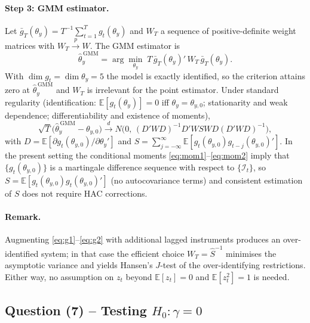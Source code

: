 \documentclass[12pt]{article}
\newcommand{\E}{\mathbb{E}}
\newcommand{\Info}{\mathcal{I}}
\begin{document}
\paragraph{Step 3: GMM estimator.} Let $\bar{g}_T(\theta_y)=T^{-1}\sum_{t=1}^{T}g_t(\theta_y)$ and $W_T$ a sequence of positive-definite weight matrices with $W_T\xrightarrow{p}W$. The GMM estimator is
\begin{equation}
\widehat{\theta}_y^{\,\text{GMM}}=\arg\min_{\theta_y}\;T\,\bar{g}_T(\theta_y)'\,W_T\,\bar{g}_T(\theta_y).\label{eq:gmm-obj}
\end{equation}
With $\dim g_t=\dim\theta_y=5$ the model is exactly identified, so the criterion attains zero at $\widehat{\theta}_y^{\,\text{GMM}}$ and $W_T$ is irrelevant for the point estimator. Under standard regularity (identification: $\E[g_t(\theta_y)]=0$ iff $\theta_y=\theta_{y,0}$; stationarity and weak dependence; differentiability and existence of moments),
\begin{equation*}
\sqrt{T}\big(\widehat{\theta}_y^{\,\text{GMM}}-\theta_{y,0}\big)\xrightarrow{d} N\!\big(0,\,(D'WD)^{-1}D'WSWD(D'WD)^{-1}\big),
\end{equation*}
with $D=\E[\partial g_t(\theta_{y,0})/\partial\theta_y']$ and $S=\sum_{j=-\infty}^{\infty}\E[g_t(\theta_{y,0})g_{t-j}(\theta_{y,0})']$. In the present setting the conditional moments \eqref{eq:mom1}--\eqref{eq:mom2} imply that $\{g_t(\theta_{y,0})\}$ is a martingale difference sequence with respect to $\{\Info_t\}$, so $S=\E[g_t(\theta_{y,0})g_t(\theta_{y,0})']$ (no autocovariance terms) and consistent estimation of $S$ does not require HAC corrections.

\paragraph{Remark.} Augmenting \eqref{eq:g1}--\eqref{eq:g2} with additional lagged instruments produces an over-identified system; in that case the efficient choice $W_T=\widehat{S}^{-1}$ minimises the asymptotic variance and yields Hansen's $J$-test of the over-identifying restrictions. Either way, no assumption on $z_t$ beyond $\E[z_t]=0$ and $\E[z_t^2]=1$ is needed.

\subsection*{Question (7) -- Testing $H_0:\gamma=0$}\label{sec:p3-q7}
\end{document}
